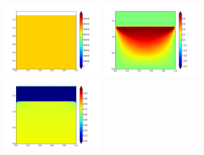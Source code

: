 \documentclass{article}
\begin{document}
\begin{figure}
{\includegraphics[width=2in]{contour-P37-ALEexp.png} \hspace{-20pt}
\includegraphics[width=2in]{contour-V18-IBexp.png} \hspace{-20pt}
\includegraphics[width=2in]{contour-P18-IBexp.png} 
}
\vspace{-8pt}
\end{figure}
\end{document}
